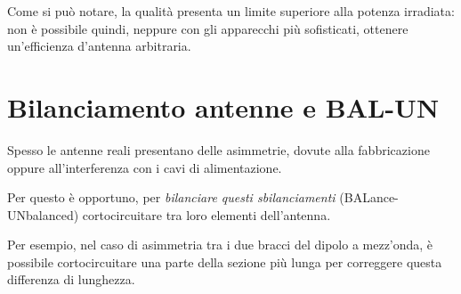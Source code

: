 Come si può notare, la qualità presenta un limite superiore alla potenza irradiata: non è possibile quindi, neppure con gli apparecchi più sofisticati, ottenere un'efficienza d'antenna arbitraria.

\section{Bilanciamento antenne e BAL-UN}

Spesso le antenne reali presentano delle asimmetrie, dovute alla fabbricazione oppure all'interferenza con i cavi di alimentazione.

Per questo è opportuno, per \emph{bilanciare questi sbilanciamenti} (BALance-UNbalanced) cortocircuitare tra loro elementi dell'antenna.

Per esempio, nel caso di asimmetria tra i due bracci del dipolo a mezz'onda, è possibile cortocircuitare una parte della sezione più lunga per correggere questa differenza di lunghezza.

